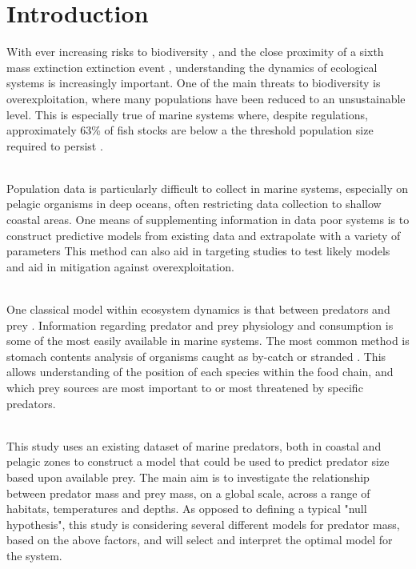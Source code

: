 \documentclass[11pt,a4paper]{article}
\begin{document}
	\section{Introduction}
	
	\par \noindent With ever increasing risks to biodiversity \citep{Kerr1995}, and the close proximity of a sixth mass extinction extinction event \citep{Barnosky2011}, understanding the dynamics of ecological systems is increasingly important. One of the main threats to biodiversity is overexploitation, where many populations have been reduced to an unsustainable level. This is especially true of marine systems where, despite regulations, approximately 63\% of fish stocks are below a the threshold population size required to persist \citep{Heithaus2008}.
	
	\par \noindent ~\\ Population data is particularly difficult to collect in marine systems, especially on pelagic organisms in deep oceans, often restricting data collection to shallow coastal areas. One means of supplementing information in data poor systems is to construct predictive models from existing data and extrapolate with a variety of parameters \citep{Levins1966} This method can also aid in targeting studies to test likely models and aid in mitigation against overexploitation.
	
	\par \noindent ~\\ One classical model within ecosystem dynamics is that between predators and prey \citep{Freedman1983}. Information regarding predator and prey physiology and consumption is some of the most easily available in marine systems. The most common method is stomach contents analysis of organisms caught as by-catch or stranded \citep{Turesson2002}. This allows understanding of the position of each species within the food chain, and which prey sources are most important to or most threatened by specific predators. 
	
	\par \noindent ~\\ This study uses an existing dataset of marine predators, both in coastal and pelagic zones to construct a model that could be used to predict predator size based upon available prey. The main aim is to investigate the relationship between predator mass and  prey mass, on a global scale, across a range of habitats, temperatures and depths. As opposed to defining a typical "null hypothesis", this study is considering several different models for predator mass, based on the above factors, and will select and interpret the optimal model for the system.
	
\end{document}
